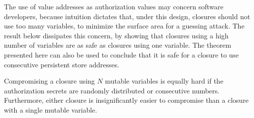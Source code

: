 The use of value addresses as authorization values may concern
software developers, because intuition dictates that, under this design,
closures should not use too many variables, to minimize the surface area
for a guessing attack. The result below dissipates this concern, by showing
that closures using a high number of variables are as safe as closures using
one variable. The theorem presented here can also be used to conclude that it is
safe for a closure to use consecutive persistent store addresses.

\begin{lemma*}
Compromising a closure using $N$ mutable variables is equally hard if the
authorization secrets are randomly distributed or consecutive numbers.
Furthermore, either closure is insignificantly easier to compromise than a
closure with a single mutable variable.
\end{lemma*}
